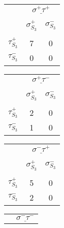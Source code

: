 \documentclass[12pt]{article}
\begin{document}
\begin{center}
\begin{tabular}{ c | c | c |}
\multicolumn{1}{c}{} &\multicolumn{2}{c}{$\underline{\sigma^+ \tau^+}$} \\[-1em]
\multicolumn{1}{c}{} & \multicolumn{1}{c}{} & \multicolumn{1}{c}{} \\
\multicolumn{1}{c}{} & \multicolumn{1}{c}{$\sigma_{S_3}^+$} & \multicolumn{1}{c}{$\sigma_{S_3}^-$} \\[-1em]
\multicolumn{1}{c}{} & \multicolumn{1}{c}{} & \multicolumn{1}{c}{} \\
\cline{2-3} $\tau_{S_3}^+$ & 7 & 0 \\
\cline{2-3} $\tau_{S_3}^-$ & 0 & 0 \\
\cline{2-3}
\end{tabular} 
\hspace{.4cm}
\begin{tabular}{ c | c | c |}
\multicolumn{1}{c}{} &\multicolumn{2}{c}{$\underline{\sigma^+ \tau^-}$} \\[-1em]
\multicolumn{1}{c}{} & \multicolumn{1}{c}{} & \multicolumn{1}{c}{}\\
\multicolumn{1}{c}{} & \multicolumn{1}{c}{$\sigma_{S_3}^+$} & \multicolumn{1}{c}{$\sigma_{S_3}^-$} \\[-1em]
\multicolumn{1}{c}{} & \multicolumn{1}{c}{} & \multicolumn{1}{c}{} \\
\cline{2-3} $\tau_{S_3}^+$ & 2 & 0 \\
\cline{2-3} $\tau_{S_3}^-$ & 1 & 0 \\
\cline{2-3}
\end{tabular}
\hspace{.4cm}
\begin{tabular}{ c | c | c |}
\multicolumn{1}{c}{} &\multicolumn{2}{c}{$\underline{\sigma^- \tau^+}$} \\[-1em]
\multicolumn{1}{c}{} & \multicolumn{1}{c}{} & \multicolumn{1}{c}{}\\
\multicolumn{1}{c}{} & \multicolumn{1}{c}{$\sigma_{S_3}^+$} & \multicolumn{1}{c}{$\sigma_{S_3}^-$} \\[-1em]
\multicolumn{1}{c}{} & \multicolumn{1}{c}{} & \multicolumn{1}{c}{} \\
\cline{2-3} $\tau_{S_3}^+$ & 5 & 0 \\
\cline{2-3} $\tau_{S_3}^-$ & 2 & 0 \\
\cline{2-3}
\end{tabular}
\hspace{.4cm}
\begin{tabular}{ c | c | c |}
\multicolumn{1}{c}{} &\multicolumn{2}{c}{$\underline{\sigma^- \tau^-}$} \\[-1em]

\end{tabular}
\end{center}
\end{document}
